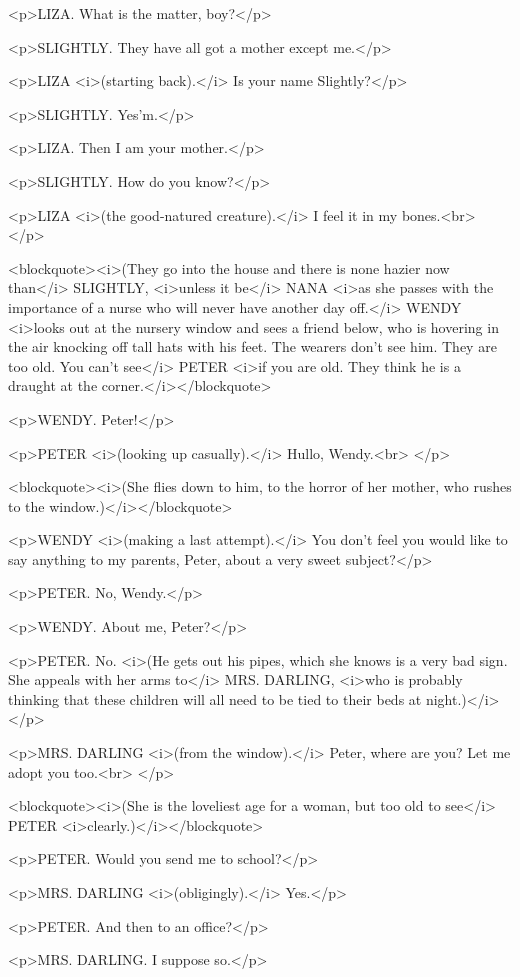 <p>LIZA. What is the matter, boy?</p>

<p>SLIGHTLY. They have all got a mother except me.</p>

<p>LIZA <i>(starting back).</i> Is your name Slightly?</p>

<p>SLIGHTLY. Yes'm.</p>

<p>LIZA. Then I am your mother.</p>

<p>SLIGHTLY. How do you know?</p>

<p>LIZA <i>(the good-natured creature).</i> I feel it in my
bones.<br>
</p>

<blockquote><i>(They go into the house and there is none hazier now
than</i> SLIGHTLY, <i>unless it be</i> NANA <i>as she passes with the
importance of a nurse who will never have another day off.</i> WENDY
<i>looks out at the nursery window and sees a friend below, who is
hovering in the air knocking off tall hats with his feet. The wearers
don't see him. They are too old. You can't see</i> PETER <i>if you
are old. They think he is a draught at the corner.</i></blockquote>

<p>WENDY. Peter!</p>

<p>PETER <i>(looking up casually).</i> Hullo, Wendy.<br>
</p>

<blockquote><i>(She flies down to him, to the horror of her mother,
who rushes to the window.)</i></blockquote>

<p>WENDY <i>(making a last attempt).</i> You don't feel you would
like to say anything to my parents, Peter, about a very sweet
subject?</p>

<p>PETER. No, Wendy.</p>

<p>WENDY. About me, Peter?</p>

<p>PETER. No. <i>(He gets out his pipes, which she knows is a very
bad sign. She appeals with her arms to</i> MRS. DARLING, <i>who is
probably thinking that these children will all need to be tied to
their beds at night.)</i></p>

<p>MRS. DARLING <i>(from the window).</i> Peter, where are you? Let
me adopt you too.<br>
</p>

<blockquote><i>(She is the loveliest age for a woman, but too old to
see</i> PETER <i>clearly.)</i></blockquote>

<p>PETER. Would you send me to school?</p>

<p>MRS. DARLING <i>(obligingly).</i> Yes.</p>

<p>PETER. And then to an office?</p>

<p>MRS. DARLING. I suppose so.</p>

